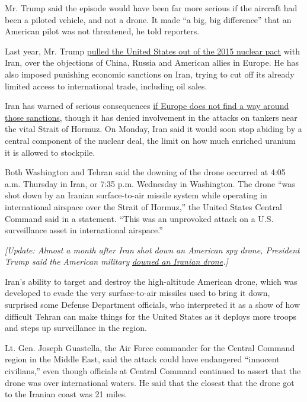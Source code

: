 Mr. Trump said the episode would have been far more serious if the
aircraft had been a piloted vehicle, and not a drone. It made ``a big,
big difference'' that an American pilot was not threatened, he told
reporters.

Last year, Mr. Trump
\href{https://www.nytimes.com/2018/05/08/world/middleeast/trump-iran-nuclear-deal.html?module=inline}{pulled
the United States out of the 2015 nuclear pact} with Iran, over the
objections of China, Russia and American allies in Europe. He has also
imposed punishing economic sanctions on Iran, trying to cut off its
already limited access to international trade, including oil sales.

Iran has warned of serious consequences
\href{https://www.nytimes.com/2019/06/18/world/europe/iran-us-nuclear-europe.html}{if
Europe does not find a way around those sanctions}, though it has denied
involvement in the attacks on tankers near the vital Strait of Hormuz.
On Monday, Iran said it would soon stop abiding by a central component
of the nuclear deal, the limit on how much enriched uranium it is
allowed to stockpile.

Both Washington and Tehran said the downing of the drone occurred at
4:05 a.m. Thursday in Iran, or 7:35 p.m. Wednesday in Washington. The
drone ``was shot down by an Iranian surface-to-air missile system while
operating in international airspace over the Strait of Hormuz,'' the
United States Central Command said in a statement. ``This was an
unprovoked attack on a U.S. surveillance asset in international
airspace.''

\emph{{[}Update: Almost a month after Iran shot down an American spy
drone, President Trump said the American military}
\href{https://www.nytimes.com/2019/07/18/us/politics/iranian-drone-shot-down.html?action=click\&module=Intentional\&pgtype=Article}{\emph{downed
an Iranian drone}}\emph{.{]}}

Iran's ability to target and destroy the high-altitude American drone,
which was developed to evade the very surface-to-air missiles used to
bring it down, surprised some Defense Department officials, who
interpreted it as a show of how difficult Tehran can make things for the
United States as it deploys more troops and steps up surveillance in the
region.

Lt. Gen. Joseph Guastella, the Air Force commander for the Central
Command region in the Middle East, said the attack could have endangered
``innocent civilians,'' even though officials at Central Command
continued to assert that the drone was over international waters. He
said that the closest that the drone got to the Iranian coast was 21
miles.


